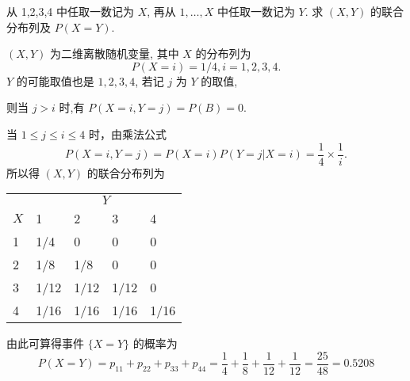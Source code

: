    \begin{example}\label{exam:3.1.2}
   		从 1,2,3,4 中任取一数记为 $X$, 再从 $1,\ldots,X$ 中任取一数记为 $Y$. 求 $(X,Y)$ 的联合分布列及 $P(X=Y)$.     
   \end{example}
   \begin{solution}
   		$(X,Y)$ 为二维离散随机变量, 其中 $X$ 的分布列为
         \[  
         	 P(X=i)=1/4,i=1,2,3,4.
         \]
		$Y$ 的可能取值也是 $1,2,3,4$, 若记 $j$ 为 $Y$ 的取值,

		 则当 $j>i$ 时,有 $P(X=i,Y=j)=P(B)=0$.
  
  		当 $1\leq j \leq i \leq 4$ 时，由乘法公式
  		\[
  		 	P(X=i, Y=j)=P(X=i) P(Y=j | X=i)=\frac{1}{4} \times \frac{1}{i}.
  		\]
		所以得 $(X,Y)$ 的联合分布列为
		\begin{center}
			\begin{tabularx}{0.8\textwidth}{ZZZZZ}
			\toprule
			 &  		 \\ 
			 $X$&  	1	&  2	&  3&  		4\\ 
			  	&  1/4	&  0	&  0&  		0\\
			 	&  1/8	& 1/8 	&  0&  		0\\ 
			 	& 1/12	&  1/12	&  1/12&	0\\ 
			 &  1/16	&  1/16	&  1/16&  1/16\\ 
			 \bottomrule
			\end{tabularx} 
		\end{center}
		由此可算得事件 $\{X=Y\}$ 的概率为
		\[
		 	P(X=Y)=p_{11}+p_{22}+p_{33}+p_{44}=\frac{1}{4}+\frac{1}{8}+\frac{1}{12}+\frac{1}{12}=\frac{25}{48}=0.5208
		\]
   \end{solution}

